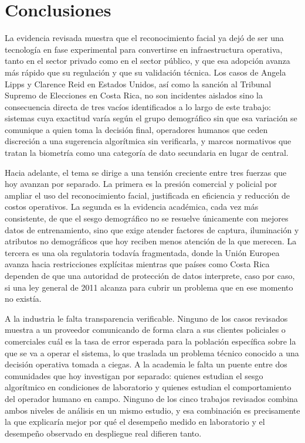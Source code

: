 %
\section{Conclusiones}
\label{sec:conclusiones}

La evidencia revisada muestra que el reconocimiento facial ya dejó de
ser una tecnología en fase experimental para convertirse en
infraestructura operativa, tanto en el sector privado como en el
sector público, y que esa adopción avanza más rápido que su
regulación y que su validación técnica. Los casos de Angela Lipps y
Clarence Reid en Estados Unidos, así como la sanción al Tribunal
Supremo de Elecciones en Costa Rica, no son incidentes aislados sino
la consecuencia directa de tres vacíos identificados a lo largo de
este trabajo: sistemas cuya exactitud varía según el grupo
demográfico sin que esa variación se comunique a quien toma la
decisión final, operadores humanos que ceden discreción a una
sugerencia algorítmica sin verificarla, y marcos normativos que tratan
la biometría como una categoría de dato secundaria en lugar de
central.

Hacia adelante, el tema se dirige a una tensión creciente entre tres
fuerzas que hoy avanzan por separado. La primera es la presión
comercial y policial por ampliar el uso del reconocimiento facial,
justificada en eficiencia y reducción de costos operativos. La
segunda es la evidencia académica, cada vez más consistente, de que
el sesgo demográfico no se resuelve únicamente con mejores datos de
entrenamiento, sino que exige atender factores de captura, iluminación
y atributos no demográficos que hoy reciben menos atención de la que
merecen. La tercera es una ola regulatoria todavía fragmentada, donde
la Unión Europea avanza hacia restricciones explícitas mientras que
países como Costa Rica dependen de que una autoridad de protección de
datos interprete, caso por caso, si una ley general de 2011 alcanza
para cubrir un problema que en ese momento no existía.

A la industria le falta transparencia verificable. Ninguno de los
casos revisados muestra a un proveedor comunicando de forma clara a
sus clientes policiales o comerciales cuál es la tasa de error
esperada para la población específica sobre la que se va a operar el
sistema, lo que traslada un problema técnico conocido a una decisión
operativa tomada a ciegas. A la academia le falta un puente entre dos
comunidades que hoy investigan por separado: quienes estudian el
sesgo algorítmico en condiciones de laboratorio y quienes estudian el
comportamiento del operador humano en campo. Ninguno de los cinco
trabajos revisados combina ambos niveles de análisis en un mismo
estudio, y esa combinación es precisamente la que explicaría mejor por
qué el desempeño medido en laboratorio y el desempeño observado en
despliegue real difieren tanto.

